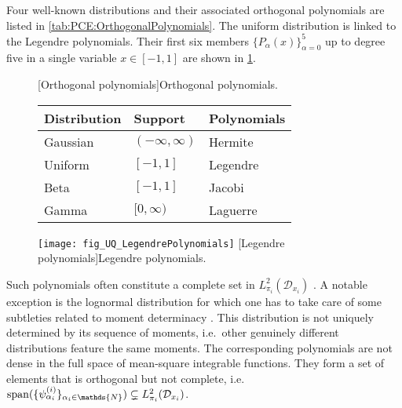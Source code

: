 Four well-known distributions and their associated orthogonal polynomials are listed in \cref{tab:PCE:OrthogonalPolynomials}.
The uniform distribution is linked to the Legendre polynomials.
Their first six members \(\{P_\alpha(x)\}_{\alpha=0}^5\) up to degree five in a single variable \(x \in [-1,1]\) are shown in \cref{fig:UQ:LegendrePolynomials}.
\begin{figure}[ht]
  \centering
  \begin{minipage}[c]{0.45\textwidth}
    [Orthogonal polynomials]{Orthogonal polynomials.}
    \label{tab:PCE:OrthogonalPolynomials}
    \centering
    \begin{tabular}{lll}
      \toprule
      Distribution & Support & Polynomials \\
      \midrule
      Gaussian & \((-\infty,\infty)\) & Hermite  \\
      Uniform  & \([-1,1]\)           & Legendre \\
      Beta     & \([-1,1]\)           & Jacobi   \\
      Gamma    & \([0, \infty)\)      & Laguerre \\
      \bottomrule
    \end{tabular}
  \end{minipage}%
  \begin{minipage}[c]{0.55\textwidth}
    \centering
    \texttt{[image: fig\_UQ\_LegendrePolynomials]}
    [Legendre polynomials]{Legendre polynomials.}
    \label{fig:UQ:LegendrePolynomials}
  \end{minipage}%
\end{figure}
\par %
Such polynomials often constitute a complete set in \(L_{\pi_i}^2(\mathcal{D}_{x_i})\) \cite{PCE:Xiu2002:a,PCE:Xiu2002:b,PCE:Xiu2002:c}.
A notable exception is the lognormal distribution for which one has to take care of some subtleties related to moment determinacy \cite{PCE:Ernst2012}.
This distribution is not uniquely determined by its sequence of moments, i.e.\ other genuinely different distributions feature the same moments.
The corresponding polynomials are not dense in the full space of mean-square integrable functions.
They form a set of elements that is orthogonal but not complete, i.e.\ \(\mathrm{span}(\{\basisU^{(i)}_{\alpha_i}\}_{\alpha_i \in \mathds{N}}) \subsetneq L_{\pi_i}^2(\mathcal{D}_{x_i})\).
